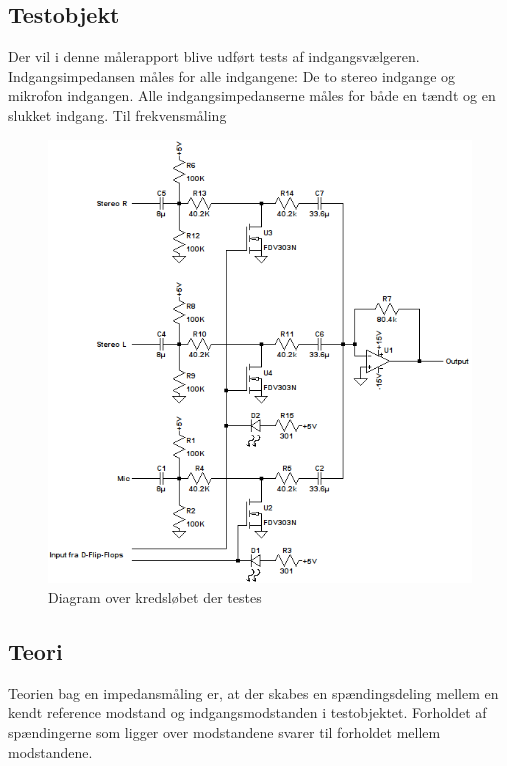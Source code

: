 \subsection*{Testobjekt}
\label{maalejournal_testobjekt}
Der vil i denne målerapport blive udført tests af indgangsvælgeren. Indgangsimpedansen måles for alle indgangene: De to stereo indgange og mikrofon indgangen. Alle indgangsimpedanserne måles for både en tændt og en slukket indgang.
Til frekvensmåling 
\begin{figure}[h]
\centering
\includegraphics[scale=0.8]{maalerapporter/indgangsvaelger/indgangvaelger_ltspice_diagram.png}
\caption{Diagram over kredsløbet der testes}
\label{maalerap-diagram_simulering}
\end{figure}

\subsection*{Teori}
\label{maalejournal_teori}
Teorien bag en impedansmåling er, at der skabes en spændingsdeling mellem en kendt reference modstand og indgangsmodstanden i testobjektet. Forholdet af spændingerne som ligger over modstandene svarer til forholdet mellem modstandene.

